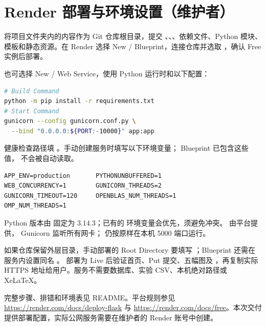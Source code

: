 \documentclass[UTF8,a4paper,12pt]{ctexart}
\begin{document}
\section{Render 部署与环境设置（维护者）}
将项目文件夹内的内容作为 Git 仓库根目录，提交 、、、依赖文件、Python 模块、模板和静态资源。在 Render 选择 New / Blueprint，连接仓库并选取 ，确认 Free 实例后部署。

也可选择 New / Web Service，使用 Python 运行时和以下配置：
\begin{lstlisting}[language=bash]
# Build Command
python -m pip install -r requirements.txt
# Start Command
gunicorn --config gunicorn.conf.py \
  --bind "0.0.0.0:${PORT:-10000}" app:app
\end{lstlisting}
健康检查路径填 。手动创建服务时填写以下环境变量；
Blueprint 已包含这些值， 不会被自动读取。
\begin{lstlisting}
APP_ENV=production       PYTHONUNBUFFERED=1
WEB_CONCURRENCY=1        GUNICORN_THREADS=2
GUNICORN_TIMEOUT=120     OPENBLAS_NUM_THREADS=1
OMP_NUM_THREADS=1
\end{lstlisting}

Python 版本由  固定为 3.14.3；已有的
 环境变量会优先，须避免冲突。 由平台提供，
Gunicorn 监听所有网卡； 仍按原样在本机 5000 端口运行。

如果仓库保留外层目录，手动部署的 Root Directory 要填写
；Blueprint 还需在服务内设置同名 。
部署为 Live 后验证首页、Put 提交、五幅图及 ，再复制实际 HTTPS
地址给用户。服务不需要数据库、实验 CSV、本机绝对路径或 XeLaTeX。

完整步骤、排错和环境表见 README。平台规则参见
\url{https://render.com/docs/deploy-flask} 与
\url{https://render.com/docs/free}。本次交付提供部署配置，实际公网服务需要在维护者的 Render 账号中创建。
\end{document}
